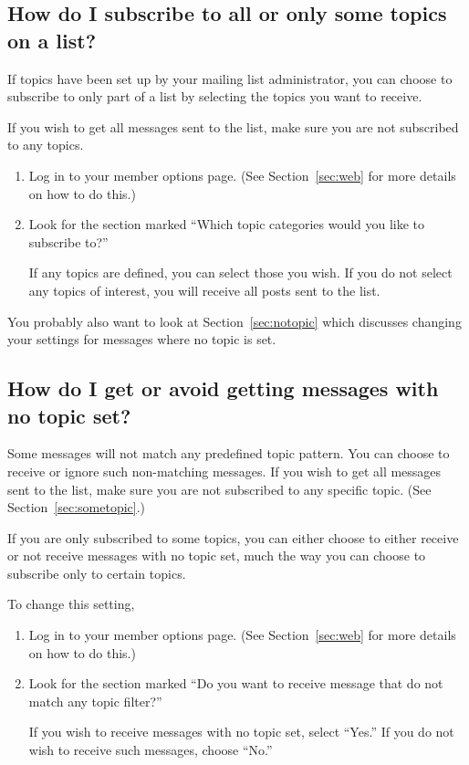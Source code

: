 \documentclass{howto}
\begin{document}
\subsection{How do I subscribe to all or only some topics on a 
	list?\label{sec:sometopic}}

If topics have been set up by your mailing list administrator, you can 
choose to subscribe to only part of a list by selecting the topics you
want to receive.

If you wish to get all messages sent to the list, make sure you 
are not subscribed to any topics.

\begin{enumerate}
	\item Log in to your member options page.  (See Section~\ref{sec:web} 
	for more details on how to do this.)
	\item Look for the section marked ``Which topic categories would you like 
	to subscribe to?'' 

	If any topics are defined, you can select those you wish.  If you do
	not select any topics of interest, you will receive all posts 
	sent to the list.
\end{enumerate}

You probably also want to look at Section~\ref{sec:notopic} which discusses
changing your settings for messages where no topic is set.

\subsection{How do I get or avoid getting messages with no topic set?
\label{sec:notopic}}
Some messages will not match any predefined topic pattern.  You can choose to
receive or ignore such non-matching messages.
If you wish to get all messages sent to the list, make sure you are 
not subscribed to any specific topic.  (See Section~\ref{sec:sometopic}.)  

If you are only subscribed to some topics, you can either choose to either
receive or not receive messages with no topic set, much the way you can 
choose to subscribe only to certain topics.

To change this setting,
\begin{enumerate}
	\item Log in to your member options page.  (See Section~\ref{sec:web} 
	for more details on how to do this.)
	\item Look for the section marked ``Do you want to receive message that do 
	not match any topic filter?''

	If you wish to receive messages with no topic set, select ``Yes.''  If you
	do not wish to receive such messages, choose ``No.''
\end{enumerate}
\end{document}
